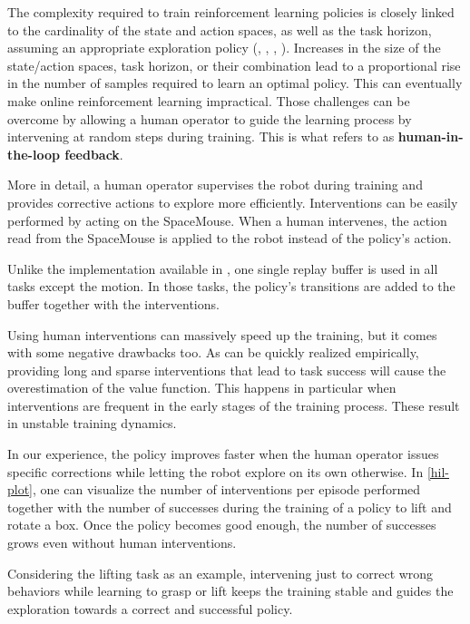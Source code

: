 \documentclass[letterpaper, 10 pt, conference]{ieeeconf}  %
\begin{document}
The complexity required to train reinforcement learning policies is closely linked to the cardinality of the state and action spaces, as well as the task horizon, assuming an appropriate exploration policy (\cite{jin2018qlearningprovablyefficient}, \cite{jin2019provablyefficientreinforcementlearning}, \cite{azar2012samplecomplexityreinforcementlearning}, \cite{kearns2002near}). Increases in the size of the state/action spaces, task horizon, or their combination lead to a proportional rise in the number of samples required to learn an optimal policy. This can eventually make online reinforcement learning impractical. 
Those challenges can be overcome by allowing a human operator to guide the learning process by intervening at random steps during training. This is what \cite{luo2024precisedexterousroboticmanipulation} refers to as \textbf{human-in-the-loop feedback}.

More in detail, a human operator supervises the robot during training and provides corrective actions to explore more efficiently. Interventions can be easily performed by acting on the SpaceMouse. When a human intervenes, the action read from the SpaceMouse is applied to the robot instead of the policy's action.

Unlike the implementation available in \cite{luo2024precisedexterousroboticmanipulation}, one single replay buffer is used in all tasks except the motion. In those tasks, the policy's transitions are added to the buffer together with the interventions.

Using human interventions can massively speed up the training, but it comes with some negative drawbacks too. As can be quickly realized empirically, providing long and sparse interventions that lead to task success will cause the overestimation of the value function. This happens in particular when interventions are frequent in the early stages of the training process. These result in unstable training dynamics.

In our experience, the policy improves faster when the human operator issues specific corrections while letting the robot explore on its own otherwise. 
In  \cref{hil-plot}, one can visualize the number of interventions per episode performed together with the number of successes during the training of a policy to lift and rotate a box. Once the policy becomes good enough, the number of successes grows even without human interventions.

Considering the lifting task as an example, intervening just to correct wrong behaviors while learning to grasp or lift keeps the training stable and guides the exploration towards a correct and successful policy. 
\end{document}
